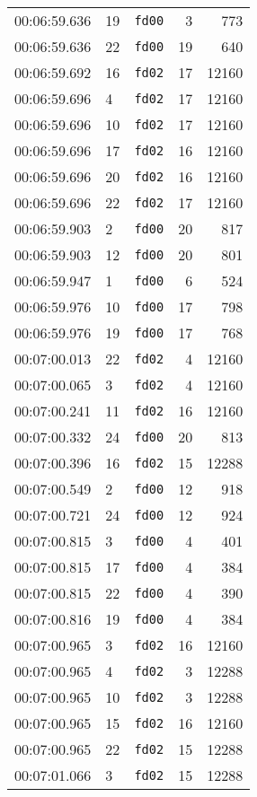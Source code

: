 \documentclass{article}
\begin{document}
\begin{longtable}{lllrr}
00:06:59.636 & 19 & \texttt{fd00} & 3 & 773 \\
00:06:59.636 & 22 & \texttt{fd00} & 19 & 640 \\
00:06:59.692 & 16 & \texttt{fd02} & 17 & 12160 \\
00:06:59.696 & 4 & \texttt{fd02} & 17 & 12160 \\
00:06:59.696 & 10 & \texttt{fd02} & 17 & 12160 \\
00:06:59.696 & 17 & \texttt{fd02} & 16 & 12160 \\
00:06:59.696 & 20 & \texttt{fd02} & 16 & 12160 \\
00:06:59.696 & 22 & \texttt{fd02} & 17 & 12160 \\
00:06:59.903 & 2 & \texttt{fd00} & 20 & 817 \\
00:06:59.903 & 12 & \texttt{fd00} & 20 & 801 \\
00:06:59.947 & 1 & \texttt{fd00} & 6 & 524 \\
00:06:59.976 & 10 & \texttt{fd00} & 17 & 798 \\
00:06:59.976 & 19 & \texttt{fd00} & 17 & 768 \\
00:07:00.013 & 22 & \texttt{fd02} & 4 & 12160 \\
00:07:00.065 & 3 & \texttt{fd02} & 4 & 12160 \\
00:07:00.241 & 11 & \texttt{fd02} & 16 & 12160 \\
00:07:00.332 & 24 & \texttt{fd00} & 20 & 813 \\
00:07:00.396 & 16 & \texttt{fd02} & 15 & 12288 \\
00:07:00.549 & 2 & \texttt{fd00} & 12 & 918 \\
00:07:00.721 & 24 & \texttt{fd00} & 12 & 924 \\
00:07:00.815 & 3 & \texttt{fd00} & 4 & 401 \\
00:07:00.815 & 17 & \texttt{fd00} & 4 & 384 \\
00:07:00.815 & 22 & \texttt{fd00} & 4 & 390 \\
00:07:00.816 & 19 & \texttt{fd00} & 4 & 384 \\
00:07:00.965 & 3 & \texttt{fd02} & 16 & 12160 \\
00:07:00.965 & 4 & \texttt{fd02} & 3 & 12288 \\
00:07:00.965 & 10 & \texttt{fd02} & 3 & 12288 \\
00:07:00.965 & 15 & \texttt{fd02} & 16 & 12160 \\
00:07:00.965 & 22 & \texttt{fd02} & 15 & 12288 \\
00:07:01.066 & 3 & \texttt{fd02} & 15 & 12288 \\

\end{longtable}
\end{document}
